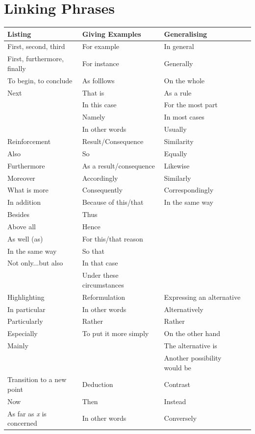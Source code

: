 \section{Linking Phrases}
\begin{tabular}{ | l | l | l | l |}
    \hline
    Listing & Giving Examples & Generalising \\ \hline
 First, second, third  & For example & In general\\
 First, furthermore, finally & For instance & Generally\\ 
 To begin, to conclude & As folllows & On the whole\\
 Next & That is & As a rule \\
 & In this case & For the most part \\
 & Namely & In most cases\\
 & In other words & Usually \\
 \hline
 Reinforcement & Result/Consequence & Similarity \\
 \hline
 Also & So & Equally \\
 Furthermore & As a result/consequence & Likewise \\
 Moreover & Accordingly & Similarly \\
 What is more & Consequently & Correspondingly \\
 In addition & Because of this/that & In the same way \\
 Besides & Thus \\
 Above all & Hence \\
 As well (as) & For this/that reason \\
 In the same way & So that \\
 Not only...but also & In that case \\
 & Under these circumstances \\
\hline
Highlighting & Reformulation & Expressing an alternative \\
\hline
In particular & In other words & Alternatively \\
Particularly & Rather & Rather \\
Especially & To put it more simply & On the other hand \\
Mainly & & The alternative is \\
& & Another possibility would be \\ 
\hline
Transition to a new point & Deduction & Contrast \\
\hline
Now & Then & Instead \\
As far as \emph{x} is concerned & In other words & Conversely \\

\end{tabular}
